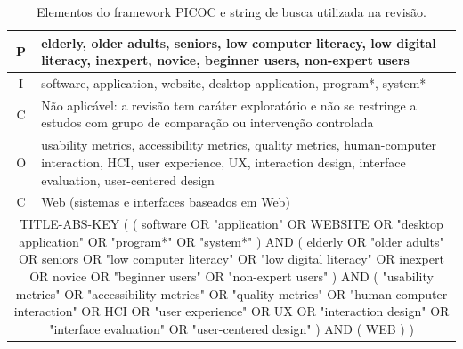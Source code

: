 \begin{table}[H]
\centering
\begin{tabular}{|c|p{11cm}|}
\hline
P & elderly, older adults, seniors, low computer literacy, low digital literacy, inexpert, novice, beginner users, non-expert users \\ \hline
I & software, application, website, desktop application, program*, system* \\ \hline
C & Não aplicável: a revisão tem caráter exploratório e não se restringe a estudos com grupo de comparação ou intervenção controlada \\ \hline
O & usability metrics, accessibility metrics, quality metrics, human-computer interaction, HCI, user experience, UX, interaction design, interface evaluation, user-centered design \\ \hline
C & Web (sistemas e interfaces baseados em Web) \\ \hline
\multicolumn{2}{|c|}{\begin{minipage}{15cm}
\centering
TITLE-ABS-KEY ( ( software OR "application" OR WEBSITE OR "desktop application" OR "program*" OR "system*" ) AND ( elderly OR "older adults" OR seniors OR "low computer literacy" OR "low digital literacy" OR inexpert OR novice OR "beginner users" OR "non-expert users" ) AND ( "usability metrics" OR "accessibility metrics" OR "quality metrics" OR "human-computer interaction" OR HCI OR "user experience" OR UX OR "interaction design" OR "interface evaluation" OR "user-centered design" ) AND ( WEB ) )
\end{minipage}} \\ \hline
\end{tabular}
\caption{Elementos do framework PICOC e string de busca utilizada na revisão.}
\label{tab:picoc}
\end{table}